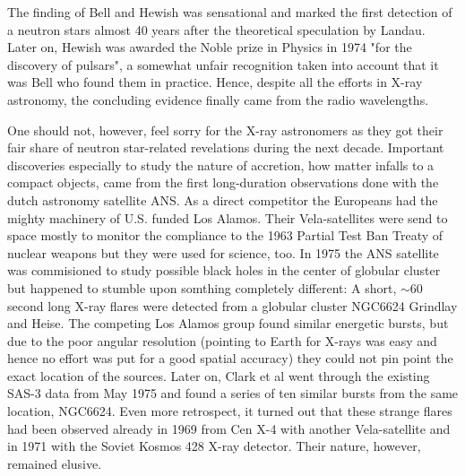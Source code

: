 The finding of Bell and Hewish was sensational and marked the first detection of a neutron stars almost 40 years after the theoretical speculation by Landau.
Later on, Hewish was awarded the Noble prize in Physics in 1974 "for the discovery of pulsars", a somewhat unfair recognition taken into account that it was Bell who found them in practice.
Hence, despite all the efforts in X-ray astronomy, the concluding evidence finally came from the radio wavelengths.



One should not, however, feel sorry for the X-ray astronomers as they got their fair share of neutron star-related revelations during the next decade.
Important discoveries especially to study the nature of accretion, how matter infalls to a compact objects, came from the first long-duration observations done with the dutch astronomy satellite ANS.
As a direct competitor the Europeans had the mighty machinery of U.S. funded Los Alamos.
Their Vela-satellites were send to space mostly to monitor the compliance to the 1963 Partial Test Ban Treaty of nuclear weapons but they were used for science, too.
In 1975 the ANS satellite was commisioned to study possible black holes in the center of globular cluster but happened to stumble upon somthing completely different:
A short, $\sim 60$ second long X-ray flares were detected from a globular cluster NGC6624 Grindlay and Heise.\cite{GGS76}
The competing Los Alamos group found similar energetic bursts, but due to the poor angular resolution (pointing to Earth for X-rays was easy and hence no effort was put for a good spatial accuracy) they could not pin point the exact location of the sources.\cite{BCE76}
Later on, Clark et al went through the existing SAS-3 data from May 1975 and found a series of ten similar bursts from the same location, NGC6624.\cite{CJB76}
Even more retrospect, it turned out that these strange flares had been observed already in 1969 from Cen X-4\cite{BCE72} with another Vela-satellite and in 1971 with the Soviet Kosmos 428 X-ray detector\cite{BKM75}.
Their nature, however, remained elusive.


